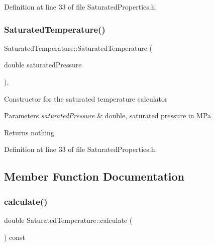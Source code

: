 Definition at line 33 of file Saturated\+Properties.\+h.

\mbox{\label{class_saturated_temperature_ae0a4b1684a756ac8f91d3ebb646d6865}} 
\subsubsection{\texorpdfstring{Saturated\+Temperature()}{SaturatedTemperature()}\hspace{0.1cm}{\footnotesize\ttfamily [3/3]}}
{\footnotesize\ttfamily Saturated\+Temperature\+::\+Saturated\+Temperature (\begin{DoxyParamCaption}\item[{double}]{saturated\+Pressure }\end{DoxyParamCaption})\hspace{0.3cm}{\ttfamily [inline]}, {\ttfamily [explicit]}}

Constructor for the saturated temperature calculator


\begin{DoxyParams}{Parameters}
{\em saturated\+Pressure} & double, saturated pressure in M\+Pa\\
\hline
\end{DoxyParams}
\begin{DoxyReturn}{Returns}
nothing 
\end{DoxyReturn}


Definition at line 33 of file Saturated\+Properties.\+h.



\subsection{Member Function Documentation}
\mbox{\label{class_saturated_temperature_a4aa0d2a337289dd36f4e063f1f67aaa5}} 
\subsubsection{\texorpdfstring{calculate()}{calculate()}\hspace{0.1cm}{\footnotesize\ttfamily [1/3]}}
{\footnotesize\ttfamily double Saturated\+Temperature\+::calculate (\begin{DoxyParamCaption}{ }\end{DoxyParamCaption}) const}

